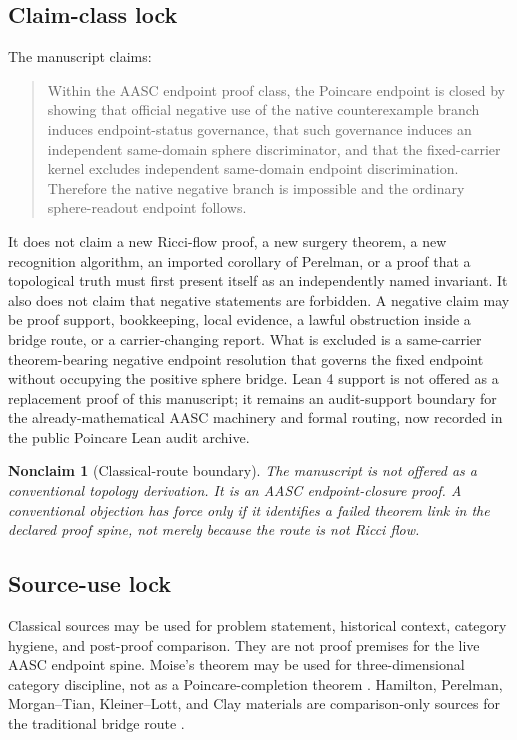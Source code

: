 \documentclass[11pt]{article}
\newtheorem{nonclaim}[theorem]{Nonclaim}
\begin{document}
\subsection{Claim-class lock}
The manuscript claims:
\begin{quote}
Within the AASC endpoint proof class, the Poincare endpoint is closed by showing that official negative use of the native counterexample branch induces endpoint-status governance, that such governance induces an independent same-domain sphere discriminator, and that the fixed-carrier kernel excludes independent same-domain endpoint discrimination. Therefore the native negative branch is impossible and the ordinary sphere-readout endpoint follows.
\end{quote}
It does not claim a new Ricci-flow proof, a new surgery theorem, a new recognition algorithm, an imported corollary of Perelman, or a proof that a topological truth must first present itself as an independently named invariant. It also does not claim that negative statements are forbidden. A negative claim may be proof support, bookkeeping, local evidence, a lawful obstruction inside a bridge route, or a carrier-changing report. What is excluded is a same-carrier theorem-bearing negative endpoint resolution that governs the fixed endpoint without occupying the positive sphere bridge. Lean 4 support is not offered as a replacement proof of this manuscript; it remains an audit-support boundary for the already-mathematical AASC machinery and formal routing, now recorded in the public Poincare Lean audit archive.

\begin{nonclaim}[Classical-route boundary]
The manuscript is not offered as a conventional topology derivation. It is an AASC endpoint-closure proof. A conventional objection has force only if it identifies a failed theorem link in the declared proof spine, not merely because the route is not Ricci flow.
\end{nonclaim}

\subsection{Source-use lock}
Classical sources may be used for problem statement, historical context, category hygiene, and post-proof comparison. They are not proof premises for the live AASC endpoint spine. Moise's theorem may be used for three-dimensional category discipline, not as a Poincare-completion theorem \cite{Moise1977}. Hamilton, Perelman, Morgan--Tian, Kleiner--Lott, and Clay materials are comparison-only sources for the traditional bridge route \cite{Hamilton1982,Perelman2002,Perelman2003Surgery,Perelman2003Extinction,MorganTian2007,KleinerLott2008,ClayPoincare,ClayMorganTian}.
\end{document}
